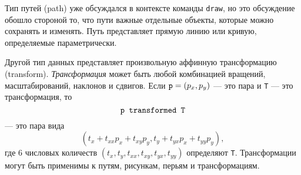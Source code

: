 \documentclass{article} %
\begin{document}
Тип путей (path) уже обсуждался в контексте команды {\tt draw}, но 
это обсуждение обошло стороной то, что пути важные отдельные объекты, которые 
можно сохранять и изменять. 
Путь представляет прямую линию или кривую, определяемые параметрически.

Другой тип данных представляет произвольную аффинную 
трансформацию (transform). 
{\em Трансформация} может быть любой комбинацией вращений, масштабирований, 
наклонов и сдвигов.
Если ${\tt
p}=(p_x,p_y)$ --- это пара и {\tt T} --- это 
трансформация, то
$$ \hbox{\tt p transformed T} $$
--- это пара вида
$$ (t_x+t_{xx}p_x+t_{xy}p_y, t_y+t_{yx}p_x+t_{yy}p_y), $$
где 6 числовых количеств $(t_x,t_y,t_{xx},t_{xy},t_{yx},t_{yy})$ 
определяют {\tt T}.
Трансформации могут быть применимы к путям, рисункам, перьям и трансформациям. 
\end{document}

